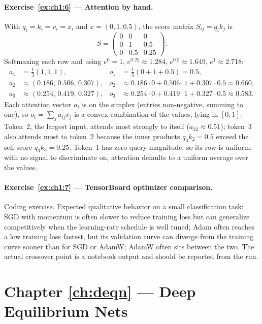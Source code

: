\documentclass[11pt,a4paper]{report}
\begin{document}
\paragraph{Exercise~\ref{ex:ch1:6} --- Attention by hand.}
With $q_i = k_i = v_i = x_i$ and $x = (0,1,0.5)$, the score matrix $S_{ij} = q_i k_j$ is
\[
S = \begin{pmatrix} 0 & 0 & 0 \\ 0 & 1 & 0.5 \\ 0 & 0.5 & 0.25\end{pmatrix}.
\]
Softmaxing each row and using $e^0 = 1$, $e^{0.25} \approx 1.284$, $e^{0.5}\approx 1.649$, $e^1 \approx 2.718$:
\begin{align*}
a_1 &= \tfrac{1}{3}(1,1,1), & o_1 &= \tfrac{1}{3}(0 + 1 + 0.5) = 0.5, \\
a_2 &\approx (0.186,\, 0.506,\, 0.307), & o_2 &\approx 0.186\cdot 0 + 0.506\cdot 1 + 0.307\cdot 0.5 \approx 0.660, \\
a_3 &\approx (0.254,\, 0.419,\, 0.327), & o_3 &\approx 0.254\cdot 0 + 0.419\cdot 1 + 0.327\cdot 0.5 \approx 0.583.
\end{align*}
Each attention vector $a_i$ is on the simplex (entries non-negative, summing to one), so $o_i = \sum_j a_{ij} v_j$ is a convex combination of the values, lying in $[0, 1]$.  Token~2, the largest input, attends most strongly to itself ($a_{22}\approx 0.51$); token~3 also attends most to token~2 because the inner products $q_3 k_2 = 0.5$ exceed the self-score $q_3 k_3 = 0.25$.  Token~1 has zero query magnitude, so its row is uniform: with no signal to discriminate on, attention defaults to a uniform average over the values.

\paragraph{Exercise~\ref{ex:ch1:7} --- TensorBoard optimizer comparison.}
Coding exercise.  Expected qualitative behavior on a small classification task: SGD with momentum is often slower to reduce training loss but can generalize competitively when the learning-rate schedule is well tuned; Adam often reaches a low training loss fastest, but its validation curve can diverge from the training curve sooner than for SGD or AdamW; AdamW often sits between the two.  The actual crossover point is a notebook output and should be reported from the run.

\section{Chapter \ref{ch:deqn} --- Deep Equilibrium Nets}
\label{sol:ch2}
\end{document}
